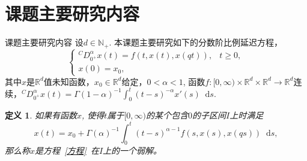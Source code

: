\documentclass[aspectratio=16 9, 10pt, notheorems]{ctexbeamer}
\let\oldeqref\eqref
\renewcommand{\eqref}[1]{~\oldeqref{#1}~}
\newcommand{\mainEquation}{方程\eqref{方程}}
\newcommand{\differential}{\mathop{}\!\mathrm{d}}
\newcommand{\realset}{\mathbb{R}}
\newcommand{\Caputo}{{^C}{D}^\alpha_{0^+}}
\newcommand{\positiveinteger}{\mathbb{N_+}}
\newtheorem*{definition}{定义}
\begin{document}
\section{课题主要研究内容}
\begin{frame}{课题主要研究内容}
    设$d\in \positiveinteger$. 本课题主要研究如下的分数阶比例延迟方程，
\begin{equation}\label{方程}
    \begin{cases}%
        \Caputo x(t) = f(t, x(t), x(qt)),&t\geqslant 0,\\
        x(0) = x_0,
    \end{cases}
\end{equation}
其中$x$是$\realset^d$值未知函数，$x_0\in \realset^d$给定，$0<\alpha<1$, 函数$f:[0,\infty)\times \realset^d\times \realset^d\to\realset^d$连续，$\Caputo x(t)=\Gamma(1-\alpha)^{-1}\int_{0}^{t}(t-s)^{-\alpha}x'(s)\differential s$.

\begin{definition}
    如果有函数$x$, 使得$t$属于$[0,\infty)$的某个包含$0$的子区间$I$上时满足
\begin{equation*}\label{mild solution}
    x(t)=x_0+\Gamma(\alpha)^{-1}\int_{0}^{t} (t-s)^{\alpha-1} f(s,x(s),x(qs)) \differential s,
\end{equation*}
那么称$x$是\mainEquation 在$I$上的一个弱解。
\end{definition}
\end{frame}
\end{document}
